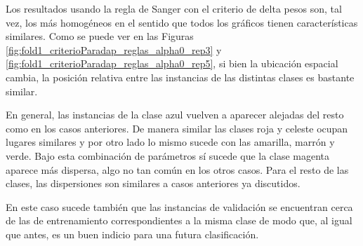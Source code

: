 \documentclass[informe.tex]{subfiles}
\begin{document}
      
      
      
      
	Los resultados usando la regla de Sanger con el criterio de delta pesos son, tal vez, los más homogéneos en el sentido que todos los gráficos tienen características similares. Como se puede ver en las Figuras \ref{fig:fold1_criterioParadap_reglas_alpha0_rep3} y \ref{fig:fold1_criterioParadap_reglas_alpha0_rep5}, si bien la ubicación espacial cambia, la posición relativa entre las instancias de las distintas clases es bastante similar. 
	
	En general, las instancias de la clase azul vuelven a aparecer alejadas del resto como en los casos anteriores. De manera similar las clases roja y celeste ocupan lugares similares y por otro lado lo mismo sucede con las amarilla, marrón y verde. Bajo esta combinación de parámetros sí sucede que la clase magenta aparece más dispersa, algo no tan común en los otros casos. Para el resto de las clases, las dispersiones son similares a casos anteriores ya discutidos.
	
	En este caso sucede también que las instancias de validación se encuentran cerca de las de entrenamiento correspondientes a la misma clase de modo que, al igual que antes, es un buen indicio para una futura clasificación.
 
\end{document}
